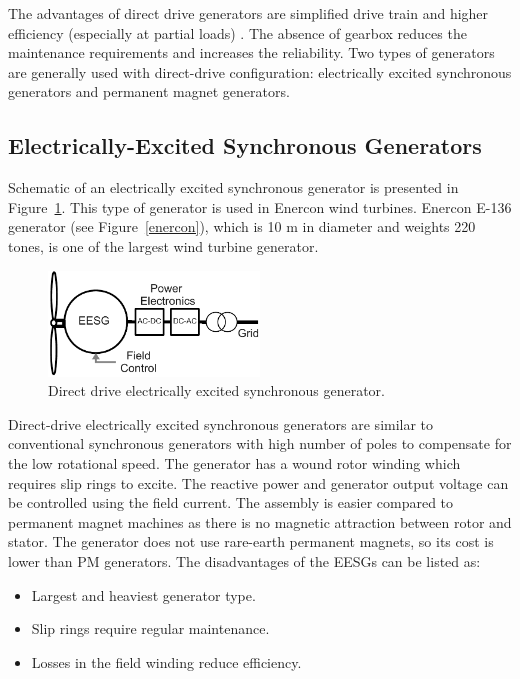 \documentclass[a4paper, 11pt]{article} %
\begin{document}
The advantages of direct drive generators are simplified drive train and higher efficiency (especially at partial loads) \cite{Li2008a}. The absence of gearbox reduces the maintenance requirements and increases the reliability. Two types of generators are generally used with direct-drive configuration: electrically excited synchronous generators and permanent magnet generators. 

\subsection{Electrically-Excited Synchronous Generators}

Schematic of an electrically excited synchronous generator is presented in Figure~\ref{eesg}. This type of generator is used in Enercon wind turbines. Enercon E-136 generator (see Figure~\ref{enercon}), which is 10 m in diameter and weights 220 tones, is one of the largest wind turbine generator. 

\begin{figure}
    \centering
    \includegraphics[width=0.5\textwidth]{EESG}
    \caption{Direct drive electrically excited synchronous generator.} 
    \label{eesg}
  \end{figure}

Direct-drive electrically excited synchronous generators are similar to conventional synchronous generators with high number of poles to compensate for the low rotational speed. The generator has a wound rotor winding which requires slip rings to excite. The reactive power and generator output voltage can be controlled using the field current. The assembly is easier compared to permanent magnet machines as there is no magnetic attraction between rotor and stator. The generator does not use rare-earth permanent magnets, so its cost is lower than PM generators. The disadvantages of the EESGs can be listed as:

\begin{itemize}
	\item Largest and heaviest generator type.
	\item Slip rings require regular maintenance.
	\item Losses in the field winding reduce efficiency.
\end{itemize}
\end{document}
